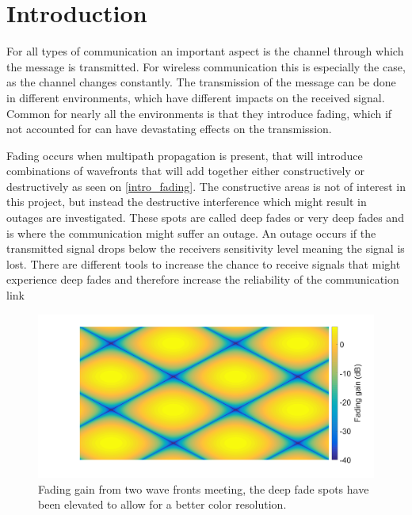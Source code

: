 \chapter{Introduction}
\label{chap:introduction}
%





For all types of communication an important aspect is the channel through which the message is transmitted. For wireless communication this is especially the case, as the channel changes constantly. The transmission of the message can be done in different environments, which have different impacts on the received signal. Common for nearly all the environments is that they introduce fading, which if not accounted for can have devastating effects on the transmission. 

Fading occurs when multipath propagation is present, that will introduce combinations of wavefronts that will add together either constructively or destructively as seen on \autoref{intro_fading}. The constructive areas is not of interest in this project, but instead the destructive interference which might result in outages are investigated. These spots are called deep fades or very deep fades and is where the communication might suffer an outage. An outage occurs if the transmitted signal drops below the receivers sensitivity level meaning the signal is lost. There are different tools to increase the chance to receive signals that might experience deep fades and therefore increase the reliability of the communication link


\begin{figure}[H]
\centering
\includegraphics[width=\textwidth]{figures/intro_fading.png}
\caption{Fading gain from two wave fronts meeting, the deep fade spots have been elevated to allow for a better color resolution.}
\label{intro_fading}
\end{figure}

